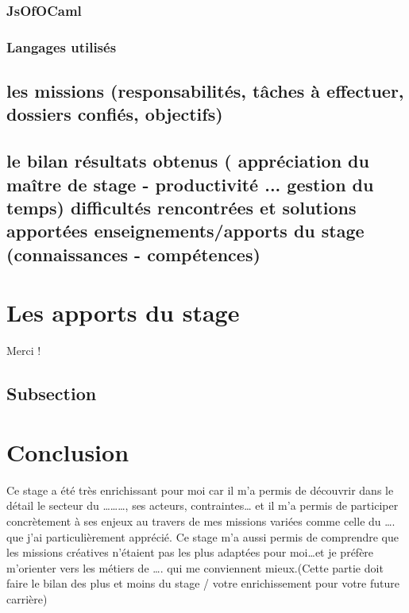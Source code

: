 \documentclass{article}
\begin{document}
\subsubsection{JsOfOCaml}
\subsubsection{Langages utilisés}







\subsection{les missions (responsabilités, tâches à effectuer, dossiers confiés, objectifs)}

\subsection{le bilan
résultats obtenus ( appréciation du maître de stage - productivité ... gestion du temps)
difficultés rencontrées et solutions apportées
enseignements/apports du stage (connaissances - compétences)}

\newpage

\section{Les apports du stage}
Merci !

\subsection{Subsection}

\newpage

\section{Conclusion}

Ce stage a été très enrichissant pour moi car il m’a permis de découvrir dans le détail le secteur du ………, ses acteurs, contraintes… et il m’a permis de participer concrètement à ses enjeux au travers de mes missions variées comme celle du …. que j’ai particulièrement apprécié. Ce stage m’a aussi permis de comprendre que les missions créatives n’étaient pas les plus adaptées pour moi…et je préfère m’orienter vers les métiers de …. qui me conviennent mieux.(Cette partie doit faire le bilan des plus et moins du stage / votre enrichissement pour votre future carrière)
\end{document}
